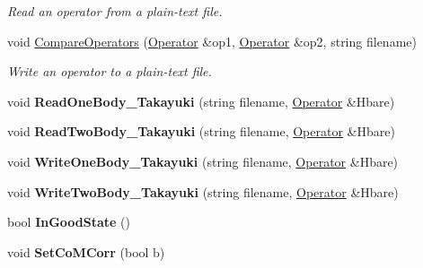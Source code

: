 \begin{DoxyCompactItemize}
\begin{DoxyCompactList}\small\item\em Read an operator from a plain-\/text file. \end{DoxyCompactList}\item 
\hypertarget{classReadWrite_a1275273dc4057c79a8e8c7d96b74f359}{void \hyperlink{classReadWrite_a1275273dc4057c79a8e8c7d96b74f359}{Compare\-Operators} (\hyperlink{classOperator}{Operator} \&op1, \hyperlink{classOperator}{Operator} \&op2, string filename)}\label{classReadWrite_a1275273dc4057c79a8e8c7d96b74f359}

\begin{DoxyCompactList}\small\item\em Write an operator to a plain-\/text file. \end{DoxyCompactList}\item 
\hypertarget{classReadWrite_a5486b782a5b2e137fea52e28e592c1fa}{void {\bfseries Read\-One\-Body\-\_\-\-Takayuki} (string filename, \hyperlink{classOperator}{Operator} \&Hbare)}\label{classReadWrite_a5486b782a5b2e137fea52e28e592c1fa}

\item 
\hypertarget{classReadWrite_a2c8e5f9f0f28a521501b3641390ecce4}{void {\bfseries Read\-Two\-Body\-\_\-\-Takayuki} (string filename, \hyperlink{classOperator}{Operator} \&Hbare)}\label{classReadWrite_a2c8e5f9f0f28a521501b3641390ecce4}

\item 
\hypertarget{classReadWrite_a085e8fbf3a73da1e127e7454392e0bca}{void {\bfseries Write\-One\-Body\-\_\-\-Takayuki} (string filename, \hyperlink{classOperator}{Operator} \&Hbare)}\label{classReadWrite_a085e8fbf3a73da1e127e7454392e0bca}

\item 
\hypertarget{classReadWrite_a7521de830de68614bb55147e4054c8df}{void {\bfseries Write\-Two\-Body\-\_\-\-Takayuki} (string filename, \hyperlink{classOperator}{Operator} \&Hbare)}\label{classReadWrite_a7521de830de68614bb55147e4054c8df}

\item 
\hypertarget{classReadWrite_a05ec8e21842e94d788bb36c7d11f46b9}{bool {\bfseries In\-Good\-State} ()}\label{classReadWrite_a05ec8e21842e94d788bb36c7d11f46b9}

\item 
\hypertarget{classReadWrite_a5e81dd4ce4adfe6fc08af81440003bb9}{void {\bfseries Set\-Co\-M\-Corr} (bool b)}\label{classReadWrite_a5e81dd4ce4adfe6fc08af81440003bb9}

\end{DoxyCompactItemize}
